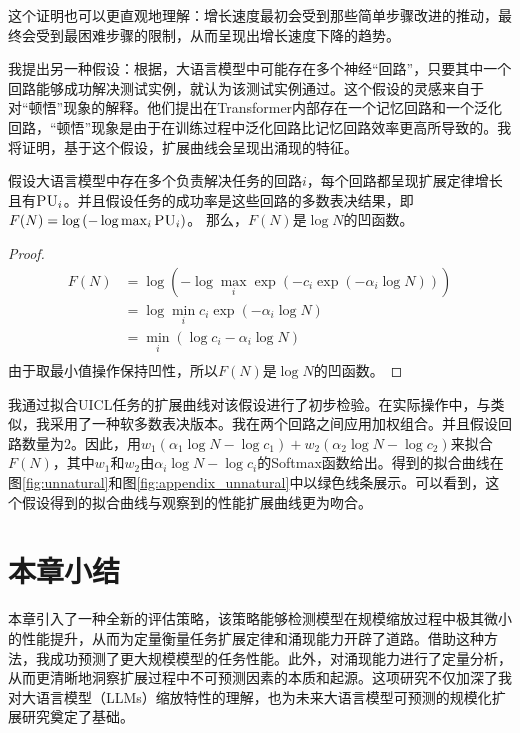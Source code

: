 这个证明也可以更直观地理解：增长速度最初会受到那些简单步骤改进的推动，最终会受到最困难步骤的限制，从而呈现出增长速度下降的趋势。

我提出另一种假设：根据\citet{elhage2021mathematical}，大语言模型中可能存在多个神经“回路”，只要其中一个回路能够成功解决测试实例，就认为该测试实例通过。这个假设的灵感来自于\cite{varma2023explaining}对“顿悟”现象的解释。他们提出在Transformer内部存在一个记忆回路和一个泛化回路，“顿悟”现象是由于在训练过程中泛化回路比记忆回路效率更高所导致的。我将证明，基于这个假设，扩展曲线会呈现出涌现的特征。

\begin{theorem}
假设大语言模型中存在多个负责解决任务的回路\(i\)，每个回路都呈现扩展定律增长且有\(\textsc{PU}_i\)。{并且假设}任务的成功率是这些回路的多数表决结果，即\(F(N)  = \operatorname{log}\left(-\operatorname{log}\max_i \textsc{PU}_i\right)\)。
那么，\(F(N)\)是\(\operatorname{log}N\)的凹函数。
\end{theorem}

\begin{proof}
    \begin{equation}
    \label{eq:app_th_2}
    \begin{split}
    F(N) &= \operatorname{log}\left(-\operatorname{log}\max_i \operatorname{exp}\left(- c_i \operatorname{exp}(-\alpha_i \operatorname{log} N)\right)\right) \\
        &= \operatorname{log} \min_i  c_i \operatorname{exp}(-\alpha_i \operatorname{log} N) \\
    &=  \min_i (\operatorname{log} c_i-\alpha_i \operatorname{log} N) \\
    \end{split}
    \end{equation}
    由于取最小值操作保持凹性，所以\(F(N)\)是\(\operatorname{log}N\)的凹函数。 
\end{proof}


我通过拟合UICL任务的扩展曲线对该假设进行了初步检验。在实际操作中，与\cite{varma2023explaining}类似，我采用了一种软多数表决版本。我在两个回路之间应用加权组合。并且假设回路数量为\(2\)。因此，用\({w_1}({\alpha_1}\log N-\log{c_1}) + {w_2}({\alpha_2}\log N - \log c_2)\)来拟合\(F(N)\)，其中\(w_1\)和\(w_2\)由\({\alpha_i}\log N -\log {c_i}\)的Softmax函数给出。得到的拟合曲线在图\ref{fig:unnatural}和图\ref{fig:appendix_unnatural}中以{\color[rgb]{0.3, 0.6, 0.45}绿色}线条展示。可以看到，这个假设得到的拟合曲线与观察到的性能扩展曲线更为吻合。 



\section{本章小结}

本章引入了一种全新的评估策略，该策略能够检测模型在规模缩放过程中极其微小的性能提升，从而为定量衡量任务扩展定律和涌现能力开辟了道路。借助这种方法，我成功预测了更大规模模型的任务性能。此外，对涌现能力进行了定量分析，从而更清晰地洞察扩展过程中不可预测因素的本质和起源。这项研究不仅加深了我对大语言模型（LLMs）缩放特性的理解，也为未来大语言模型可预测的规模化扩展研究奠定了基础。 